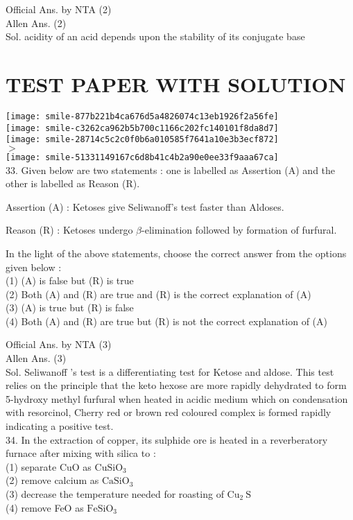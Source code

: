 \documentclass[10pt]{article}
\begin{document}
Official Ans. by NTA (2)\\
Allen Ans. (2)\\
Sol. acidity of an acid depends upon the stability of its conjugate base

\section*{TEST PAPER WITH SOLUTION}
\texttt{[image: smile-877b221b4ca676d5a4826074c13eb1926f2a56fe]}\\
\texttt{[image: smile-c3262ca962b5b700c1166c202fc140101f8da8d7]}\\
\texttt{[image: smile-28714c5c2c0f0b6a010585f7641a10e3b3ecf872]}\\
\(>\)\\
\texttt{[image: smile-51331149167c6d8b41c4b2a90e0ee33f9aaa67ca]}\\
33. Given below are two statements : one is labelled as Assertion (A) and the other is labelled as Reason (R).

Assertion (A) : Ketoses give Seliwanoff's test faster than Aldoses.

Reason (R) : Ketoses undergo \(\beta\)-elimination followed by formation of furfural.

In the light of the above statements, choose the correct answer from the options given below :\\
(1) (A) is false but (R) is true\\
(2) Both (A) and (R) are true and (R) is the correct explanation of (A)\\
(3) (A) is true but (R) is false\\
(4) Both (A) and (R) are true but (R) is not the correct explanation of (A)

Official Ans. by NTA (3)\\
Allen Ans. (3)\\
Sol. Seliwanoff 's test is a differentiating test for Ketose and aldose. This test relies on the principle that the keto hexose are more rapidly dehydrated to form 5-hydroxy methyl furfural when heated in acidic medium which on condensation with resorcinol, Cherry red or brown red coloured complex is formed rapidly indicating a positive test.\\
34. In the extraction of copper, its sulphide ore is heated in a reverberatory furnace after mixing with silica to :\\
(1) separate CuO as \(\mathrm{CuSiO}_{3}\)\\
(2) remove calcium as \(\mathrm{CaSiO}_{3}\)\\
(3) decrease the temperature needed for roasting of \(\mathrm{Cu}_{2} \mathrm{~S}\)\\
(4) remove FeO as \(\mathrm{FeSiO}_{3}\)
\end{document}
